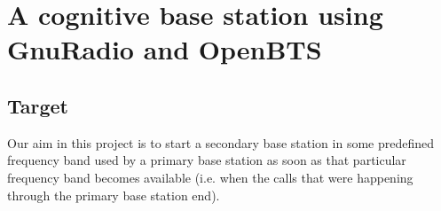 \chapter{A cognitive base station using GnuRadio and OpenBTS}
\section{Target}
Our aim in this project is to start a secondary base station in some predefined frequency band used by a 
primary base station as soon as that particular frequency band becomes available (i.e. when the calls that were
happening through the primary base station end).
